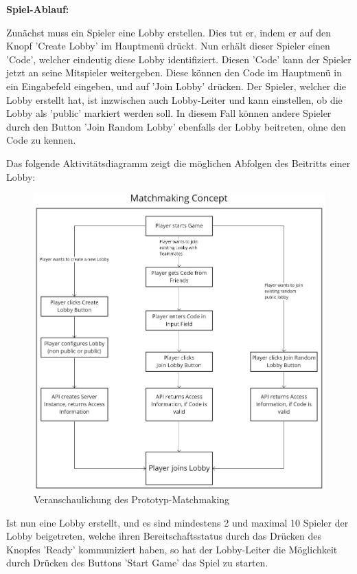 \textbf{Spiel-Ablauf:}

Zunächst muss ein Spieler eine Lobby erstellen. Dies tut er, indem er auf den Knopf 'Create Lobby' im Hauptmenü drückt. Nun erhält dieser Spieler einen 'Code', welcher eindeutig diese Lobby identifiziert. Diesen 'Code' kann der Spieler jetzt an seine Mitspieler weitergeben. Diese können den Code im Hauptmenü in ein Eingabefeld eingeben, und auf 'Join Lobby' drücken. Der Spieler, welcher die Lobby erstellt hat, ist inzwischen auch Lobby-Leiter und kann einstellen, ob die Lobby als 'public' markiert werden soll. In diesem Fall können andere Spieler durch den Button 'Join Random Lobby' ebenfalls der Lobby beitreten, ohne den Code zu kennen. 

Das folgende Aktivitätsdiagramm zeigt die möglichen Abfolgen des Beitritts einer Lobby:

\begin{figure}[H]
	\centering
	\includegraphics[width=150mm]{images/matchmaking_concept.jpg}
	\caption[Matchmaking-Konzept Diagramm]{Veranschaulichung des Prototyp-Matchmaking}
	\label{pic:matchmaking_concept}
\end{figure}

Ist nun eine Lobby erstellt, und es sind mindestens 2 und maximal 10 Spieler der Lobby beigetreten, welche ihren Bereitschaftsstatus durch das Drücken des Knopfes 'Ready' kommuniziert haben, so hat der Lobby-Leiter die Möglichkeit durch Drücken des Buttons 'Start Game' das Spiel zu starten.

